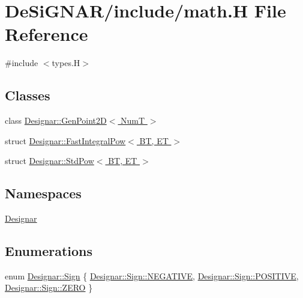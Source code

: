 \hypertarget{math_8_h}{}\section{De\+Si\+G\+N\+A\+R/include/math.H File Reference}
\label{math_8_h}
{\ttfamily \#include $<$types.\+H$>$}\newline
\subsection*{Classes}
\begin{DoxyCompactItemize}
\item 
class \hyperlink{class_designar_1_1_gen_point2_d}{Designar\+::\+Gen\+Point2\+D$<$ Num\+T $>$}
\item 
struct \hyperlink{struct_designar_1_1_fast_integral_pow}{Designar\+::\+Fast\+Integral\+Pow$<$ B\+T, E\+T $>$}
\item 
struct \hyperlink{struct_designar_1_1_std_pow}{Designar\+::\+Std\+Pow$<$ B\+T, E\+T $>$}
\end{DoxyCompactItemize}
\subsection*{Namespaces}
\begin{DoxyCompactItemize}
\item 
 \hyperlink{namespace_designar}{Designar}
\end{DoxyCompactItemize}
\subsection*{Enumerations}
\begin{DoxyCompactItemize}
\item 
enum \hyperlink{namespace_designar_aee82690b26e153ff9bcb37b8144b83f4}{Designar\+::\+Sign} \{ \hyperlink{namespace_designar_aee82690b26e153ff9bcb37b8144b83f4a50546bf973283065b6ccf09faf7a580a}{Designar\+::\+Sign\+::\+N\+E\+G\+A\+T\+I\+VE}, 
\hyperlink{namespace_designar_aee82690b26e153ff9bcb37b8144b83f4aab6c31432785221bae58327ef5f6ea58}{Designar\+::\+Sign\+::\+P\+O\+S\+I\+T\+I\+VE}, 
\hyperlink{namespace_designar_aee82690b26e153ff9bcb37b8144b83f4a529e9e0beb5f85d1f132917c1a09860c}{Designar\+::\+Sign\+::\+Z\+E\+RO}
 \}
\end{DoxyCompactItemize}
